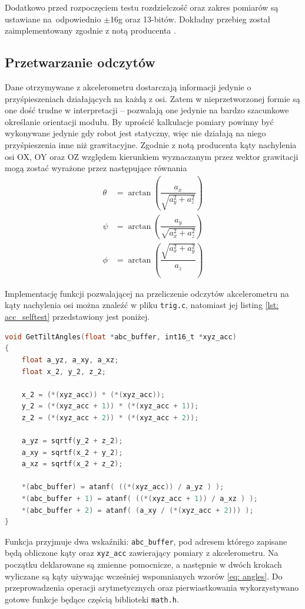 Dodatkowo przed rozpoczęciem testu rozdzielczość oraz zakres pomiarów są ustawiane na~odpowiednio $\pm$16g oraz 13-bitów. Dokładny przebieg został zaimplementowany zgodnie z notą producenta \cite{an1077}.

\subsection{Przetwarzanie odczytów}
Dane otrzymywane z akcelerometru dostarczają informacji jedynie o przyśpieszeniach działających na każdą z osi. Zatem w nieprzetworzonej formie są one dość trudne w interpretacji -- pozwalają one jedynie na bardzo szacunkowe określanie orientacji modułu. By uprościć kalkulacje pomiary powinny być wykonywane jedynie gdy robot jest statyczny, więc nie działają na niego przyśpieszenia inne niż grawitacyjne. Zgodnie z notą producenta \cite{an1057} kąty nachylenia osi OX, OY oraz OZ względem kierunkiem wyznaczanym przez wektor grawitacji mogą zostać wyrażone przez następujące równania
    \begin{align}
        \theta &= \arctan \left( \dfrac{a_x}{\sqrt{a_y^2 + a_z^2}} \right) \\
        \psi &= \arctan \left( \dfrac{a_y}{\sqrt{a_x^2 + a_z^2}} \right) \\
        \phi &= \arctan \left( \dfrac{\sqrt{a_x^2 + a_y^2}}{a_z} \right)
        \label{eq: angles}
    \end{align}

Implementację funkcji pozwalającej na przeliczenie odczytów akcelerometru na kąty nachylenia osi można znaleźć w pliku \texttt{trig.c}, natomiast jej listing \ref{lst: acc_selftest} przedstawiony jest poniżej. 
\begin{lstlisting}[language=C,
    caption={Funkcja \texttt{GetTiltAngles}},
    label={lst: acc_selftest}]
void GetTiltAngles(float *abc_buffer, int16_t *xyz_acc)
{
    float a_yz, a_xy, a_xz;
    float x_2, y_2, z_2;

    x_2 = (*(xyz_acc)) * (*(xyz_acc));
    y_2 = (*(xyz_acc + 1)) * (*(xyz_acc + 1));
    z_2 = (*(xyz_acc + 2)) * (*(xyz_acc + 2));

    a_yz = sqrtf(y_2 + z_2);
    a_xy = sqrtf(x_2 + y_2);
    a_xz = sqrtf(x_2 + z_2);

    *(abc_buffer) = atanf( ((*(xyz_acc)) / a_yz ) );
    *(abc_buffer + 1) = atanf( ((*(xyz_acc + 1)) / a_xz ) );
    *(abc_buffer + 2) = atanf( (a_xy / (*(xyz_acc + 2))) );
}
\end{lstlisting}
Funkcja przyjmuje dwa wskaźniki: \texttt{abc\_buffer}, pod adresem którego zapisane będą obliczone kąty oraz \texttt{xyz\_acc} zawierający pomiary z akcelerometru. Na początku deklarowane są zmienne pomocnicze, a następnie w dwóch krokach wyliczane są kąty używając wcześniej wspomnianych wzorów \ref{eq: angles}. Do przeprowadzenia operacji arytmetycznych oraz pierwiastkowania wykorzystywano gotowe funkcje będące częścią biblioteki \texttt{math.h}. 

